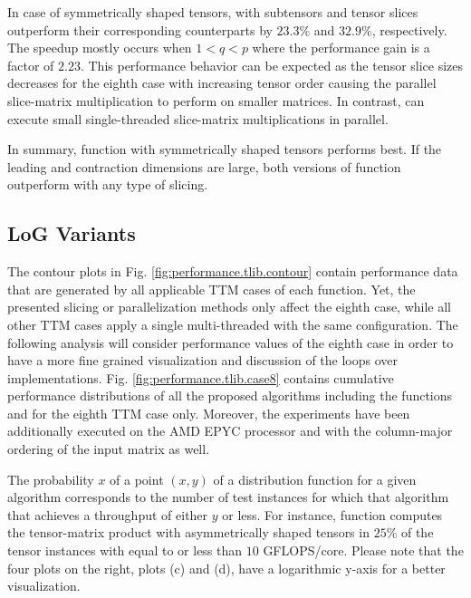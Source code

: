 In case of symmetrically shaped tensors,  with subtensors and tensor slices outperform their corresponding  counterparts by $23.3$\% and $32.9$\%, respectively.
The speedup mostly occurs when $1<q<p$ where the performance gain is a factor of $2.23$.
This performance behavior can be expected as the tensor slice sizes decreases for the eighth case with increasing tensor order causing the parallel slice-matrix multiplication to perform on smaller matrices.
In contrast,  can execute small single-threaded slice-matrix multiplications in parallel.

In summary, function  with symmetrically shaped tensors performs best.
If the leading and contraction dimensions are large, both versions of function  outperform  with any type of slicing. 

\subsection{LoG Variants}
\label{subsec:results.log}
The contour plots in Fig. \ref{fig:performance.tlib.contour} contain performance data that are generated by all applicable TTM cases of each  function.
Yet, the presented slicing or parallelization methods only affect the eighth case, while all other TTM cases apply a single multi-threaded  with the same configuration.
The following analysis will consider performance values of the eighth case in order to have a more fine grained visualization and discussion of the loops over  implementations.
Fig. \ref{fig:performance.tlib.case8} contains cumulative performance distributions of all the proposed algorithms including the functions  and  for the eighth TTM case only.
Moreover, the experiments have been additionally executed on the AMD EPYC processor and with the column-major ordering of the input matrix as well.

The probability $x$ of a point $(x,y)$ of a distribution function for a given algorithm corresponds to the number of test instances for which that algorithm that achieves a throughput of either $y$ or less.
For instance, function  computes the tensor-matrix product with asymmetrically shaped tensors in $25$\% of the tensor instances with equal to or less than $10$ GFLOPS/core.
Please note that the four plots on the right, plots (c) and (d), have a logarithmic y-axis for a better visualization.


